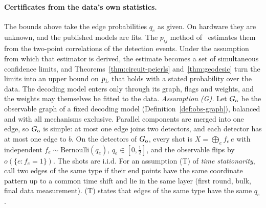 \paragraph*{Certificates from the data's own statistics.} The bounds above take the edge probabilities $q_e$ as given. On hardware they are unknown, and the published models are fits. The $p_{ij}$ method of~\cite{Google21} estimates them from the two-point correlations of the detection events. Under the assumption from which that estimator is derived, the estimate becomes a set of simultaneous confidence limits, and Theorems~\ref{thm:circuit-peierls} and~\ref{thm:geodesic} turn the limits into an upper bound on $p_{\mathrm{L}}$ that holds with a stated probability over the data. The decoding model enters only through its graph, flags and weights, and the weights may themselves be fitted to the data.
\emph{Assumption (G).} Let $G_{\rm o}$ be the observable graph of a fixed decoding model (Definition~\ref{def:obs-graph}), balanced and with all mechanisms exclusive. Parallel components are merged into one edge, so $G_{\rm o}$ is simple: at most one edge joins two detectors, and each detector has at most one edge to $b$. On the detectors of $G_{\rm o}$, every shot is $X=\bigoplus_ef_e\,e$ with independent $f_e\sim\mathrm{Bernoulli}(q_e)$, $q_e\in[0,\tfrac12]$, and the observable flips by $o(\{e:f_e=1\})$. The shots are i.i.d.
For an assumption (T) of \emph{time stationarity}, call two edges of the same type if their end points have the same coordinate pattern up to a common time shift and lie in the same layer (first round, bulk, final data measurement). (T) states that edges of the same type have the same $q_e$.

